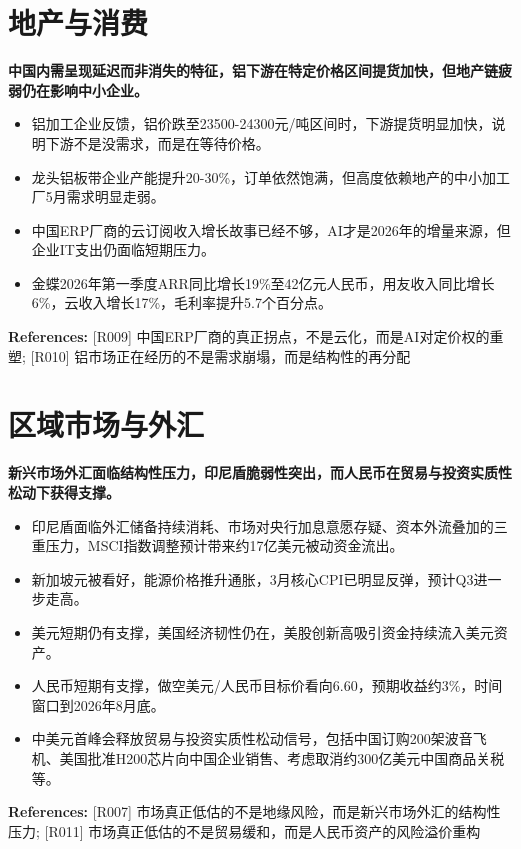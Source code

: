 \documentclass[11pt]{ctexart}
\begin{document}
\section{地产与消费}
\textbf{中国内需呈现延迟而非消失的特征，铝下游在特定价格区间提货加快，但地产链疲弱仍在影响中小企业。}

\begin{itemize}
  \item 铝加工企业反馈，铝价跌至23500-24300元/吨区间时，下游提货明显加快，说明下游不是没需求，而是在等待价格。
  \item 龙头铝板带企业产能提升20-30\%，订单依然饱满，但高度依赖地产的中小加工厂5月需求明显走弱。
  \item 中国ERP厂商的云订阅收入增长故事已经不够，AI才是2026年的增量来源，但企业IT支出仍面临短期压力。
  \item 金蝶2026年第一季度ARR同比增长19\%至42亿元人民币，用友收入同比增长6\%，云收入增长17\%，毛利率提升5.7个百分点。
\end{itemize}
{\small\color{refgray}\textbf{References:} [R009] 中国ERP厂商的真正拐点，不是云化，而是AI对定价权的重塑; [R010] 铝市场正在经历的不是需求崩塌，而是结构性的再分配}

\section{区域市场与外汇}
\textbf{新兴市场外汇面临结构性压力，印尼盾脆弱性突出，而人民币在贸易与投资实质性松动下获得支撑。}

\begin{itemize}
  \item 印尼盾面临外汇储备持续消耗、市场对央行加息意愿存疑、资本外流叠加的三重压力，MSCI指数调整预计带来约17亿美元被动资金流出。
  \item 新加坡元被看好，能源价格推升通胀，3月核心CPI已明显反弹，预计Q3进一步走高。
  \item 美元短期仍有支撑，美国经济韧性仍在，美股创新高吸引资金持续流入美元资产。
  \item 人民币短期有支撑，做空美元/人民币目标价看向6.60，预期收益约3\%，时间窗口到2026年8月底。
  \item 中美元首峰会释放贸易与投资实质性松动信号，包括中国订购200架波音飞机、美国批准H200芯片向中国企业销售、考虑取消约300亿美元中国商品关税等。
\end{itemize}
{\small\color{refgray}\textbf{References:} [R007] 市场真正低估的不是地缘风险，而是新兴市场外汇的结构性压力; [R011] 市场真正低估的不是贸易缓和，而是人民币资产的风险溢价重构}
\end{document}
